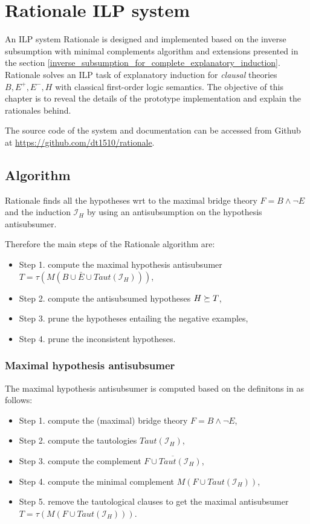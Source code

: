 \chapter{Rationale ILP system}\label{chap:rationale_ilp_system}
An ILP system Rationale is designed and implemented based on the inverse subsumption with minimal complements algorithm and extensions presented in the section \ref{inverse_subsumption_for_complete_explanatory_induction}. Rationale solves an ILP task of explanatory induction for \emph{clausal} theories $B, E^+, E^-, H$ with classical first-order logic semantics. The objective of this chapter is to reveal the details of the prototype implementation and explain the rationales behind.

The source code of the system and documentation can be accessed from Github at 
\url{https://github.com/dt1510/rationale}.

\section{Algorithm}
Rationale finds all the hypotheses wrt to the maximal bridge theory $F=B \land \neg E$ and the induction $\mathcal{I}_H$ by using an antisubsumption on the hypothesis antisubsumer.

Therefore the main steps of the Rationale algorithm are:
\begin{itemize}
\item Step 1. compute the maximal hypothesis antisubsumer
$T=\tau(M(B \cup \bar{E} \cup Taut(\mathcal{I}_H)))$,
\item Step 2. compute the antisubsumed hypotheses $H \succeq T$,
\item Step 3. prune the hypotheses entailing the negative examples,
\item Step 4. prune the inconsistent hypotheses.
\end{itemize}

\subsection{Maximal hypothesis antisubsumer}
The maximal hypothesis antisubsumer is computed based on the definitons in  as follows:

\begin{itemize}
\item Step 1. compute the (maximal) bridge theory $F=B \land \neg E$,
\item Step 2. compute the tautologies $Taut(\mathcal{I}_H)$,
\item Step 3. compute the complement $\overline{F \cup Taut(\mathcal{I}_H)}$,
\item Step 4. compute the minimal complement $M(F \cup Taut(\mathcal{I}_H))$,
\item Step 5. remove the tautological clauses to get the maximal antisubsumer $T=\tau(M(F \cup Taut(\mathcal{I}_H)))$.
\end{itemize}

